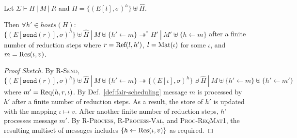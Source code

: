\begin{lem}\label{lem:resp-population}
  Let $\Sigma \vdash H~|~M~|~R$ and $H = \{ (E[t], \sigma)^h \} \uplus
  \hat{H}$.

  Then $\forall h' \in \mathit{hosts}(H)$: $\{ (E[\texttt{send}(r)],
  \sigma)^h \} \uplus \hat{H}~|~M \uplus \{ h' \leftarrow m \}
  \twoheadrightarrow^* H'~|~M' \uplus \{ h \leftarrow m \}$ after a
  finite number of reduction steps where $r = {\textrm{Ref}(l, h')}$, $l =
  {\textrm{Mat}(\iota)}$ for some $\iota$, and $m = {\textrm{Res}(\iota, v)}$.
\end{lem}
\begin{proof}[Proof Sketch]
  By \textsc{R-Send}, $\{ (E[\texttt{send}(r)], \sigma)^h \} \uplus
  \hat{H}~|~M \uplus \{ h' \leftarrow m \} \twoheadrightarrow \{
  (E[\iota], \sigma)^h \} \uplus \hat{H}~|~M \uplus \{ h' \leftarrow m
  \} \uplus \{ h' \leftarrow m' \}$ where $m' = {\textrm{Req}(h, r, \iota)}$.
  By Def.~\ref{def:fair-scheduling} message $m$ is processed by $h'$
  after a finite number of reduction steps. As a result, the store of
  $h'$ is updated with the mapping $\iota \mapsto v$. After another
  finite number of reduction steps, $h'$ processes message $m'$. By
  \textsc{R-Process}, \textsc{R-Process-Val}, and
  \textsc{Proc-ReqMat1}, the resulting multiset of messages includes
  $\{h \leftarrow {\textrm{Res}(\iota, v)} \}$ as required.
\end{proof}


